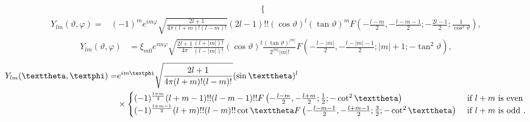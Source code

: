 \begin{fleqn}
\begin{align}
\begin{cases}
\end{cases}  \label{eq:5:2:31}
\end{align}
\begin{align}
Y_{l m}(\vartheta, \varphi)=&(-1)^{m} e^{i m \varphi} \sqrt{\frac{2 l+1}{4 \pi(l+m)!(l-m)!}}(2 l-1)!!(\cos \vartheta)^{l}(\tan \vartheta)^{m} 
F\left(-\frac{l-m}{2},-\frac{l-m-1}{2} ;-\frac{2 l-1}{2} ; \frac{1}{\cos ^{2} \vartheta}\right),  \label{eq:5:2:32}
\end{align}
\begin{align}
Y_{l m}(\vartheta, \varphi)&=\xi_{m 0} e^{i m \varphi} \sqrt{\frac{2 l+1}{4 \pi} \frac{(l+|m|)!}{(l-|m|)!}}(\cos \vartheta)^{l} \frac{(\tan \vartheta)^{|m|}}{2^{|m|}|m|!}  
F\left(-\frac{l-|m|}{2},-\frac{l-|m|-1}{2} ;|m|+1 ;-\tan ^{2} \vartheta\right),  \label{eq:5:2:33}
\end{align}
\begin{align}
 Y_{l m}(\vartheta, \varphi)=&e^{i m \varphi} \sqrt{\frac{2 l+1}{4 \pi(l+m)!(l-m)!}}(\sin \vartheta)^{l}  \notag\\
& \times\begin{cases}
(-1)^{\frac{l+m}{2}}(l+m-1)!!(l-m-1)!!F\left(-\frac{l-m}{2},-\frac{l+m}{2} ; \frac{1}{2} ;-\cot ^{2} \vartheta\right) &
\text { if } l+m \text { is even } \\
(-1)^{\frac{l+m-1}{2}}(l+m)!!(l-m)!!\cot \vartheta F\left(-\frac{l-m-1}{2},-\frac{l+m-1}{2} ; \frac{3}{2} ;-\cot ^{2} \vartheta\right) &
\text { if } l+m \text { is odd }.
\end{cases} \label{eq:5:2:34}
\end{align}
\end{fleqn}
